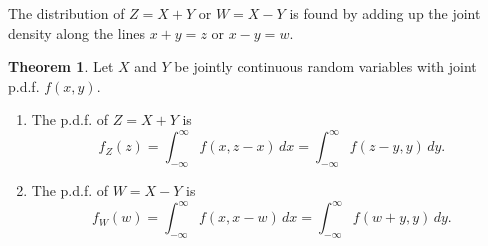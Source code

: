 \documentclass[12pt,a4paper]{report}
\theoremstyle{definition}
\newtheorem{thm}{Theorem}[section]
\theoremstyle{plain}
\begin{document}
The distribution of $Z = X + Y$ or $W = X - Y$ is found by adding up the joint
density along the lines $x + y = z$ or $x - y = w$.

\begin{thm}
\label{thm:sumdiff}
Let $X$ and $Y$ be jointly continuous random variables with joint p.d.f.
$f(x,y)$.
\begin{enumerate}
\item[(a)] The p.d.f. of $Z = X + Y$ is
\[f_Z(z) = \int_{-\infty}^\infty f(x,z-x)\,dx = \int_{-\infty}^\infty f(z-y,y)\,
dy .\]
\item[(b)] The p.d.f. of $W = X - Y$ is
\[f_W(w) = \int_{-\infty}^\infty f(x,x - w)\,dx = \int_{-\infty}^\infty
f(w+y,y)\, dy .\]
\end{enumerate}
\end{thm}
\end{document}
